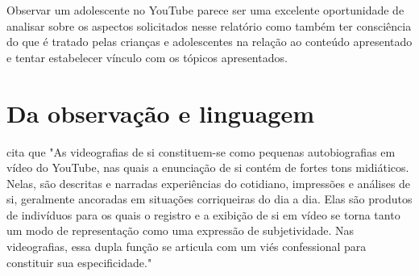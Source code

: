 Observar um adolescente no YouTube parece ser uma excelente oportunidade de analisar sobre os aspectos solicitados nesse relatório como também ter consciência do que é tratado pelas crianças e adolescentes na relação ao conteúdo apresentado e tentar estabelecer vínculo com os tópicos apresentados.



\section{Da observação e linguagem}

 cita que "As videografias de si constituem-se como pequenas autobiografias em vídeo do YouTube, nas quais a enunciação de si contém de fortes tons midiáticos. Nelas, são descritas e narradas experiências do cotidiano, impressões e análises de si, geralmente ancoradas em situações corriqueiras do dia a dia. Elas são produtos de indivíduos para os quais o registro e a exibição de si em vídeo se torna tanto um modo de representação como uma expressão de subjetividade. Nas videografias, essa dupla função se articula com um viés confessional para constituir sua especificidade."